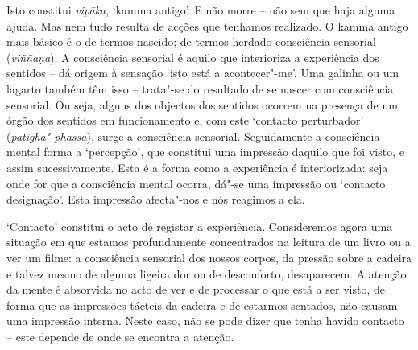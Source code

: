 Isto constitui \emph{vipāka}, `kamma antigo'. E não morre -- não sem que haja
alguma ajuda. Mas nem tudo resulta de acções que tenhamos realizado. O kamma
antigo mais básico é o de termos nascido; de termos herdado consciência
sensorial (\emph{viññaṇa}). A consciência sensorial é aquilo que interioriza a
experiência dos sentidos -- dá origem à sensação `isto está a acontecer"-me'. Uma
galinha ou um lagarto também têm isso -- trata"-se do resultado de se nascer com
consciência sensorial. Ou seja, alguns dos objectos dos sentidos ocorrem na
presença de um órgão dos sentidos em funcionamento e, com este `contacto
perturbador' (\emph{paṭigha"-phassa}), surge a consciência sensorial.
Seguidamente a consciência mental forma a `percepção', que constitui uma
impressão daquilo que foi visto, e assim sucessivamente. Esta é a forma como a
experiência é interiorizada: seja onde for que a consciência mental ocorra,
dá"-se uma impressão ou `contacto designação'. Esta impressão afecta"-nos e nós reagimos a ela.

`Contacto' constitui o acto de registar a experiência. Consideremos agora uma
situação em que estamos profundamente concentrados na leitura de um livro ou a
ver um filme: a consciência sensorial dos nossos corpos, da pressão sobre a
cadeira e talvez mesmo de alguma ligeira dor ou de desconforto, desaparecem. A
atenção da mente é absorvida no acto de ver e de processar o que está a ser
visto, de forma que as impressões tácteis da cadeira e de estarmos sentados, não
causam uma impressão interna.
Neste caso, não se pode dizer que tenha havido contacto -- este depende de onde
se encontra a atenção.

